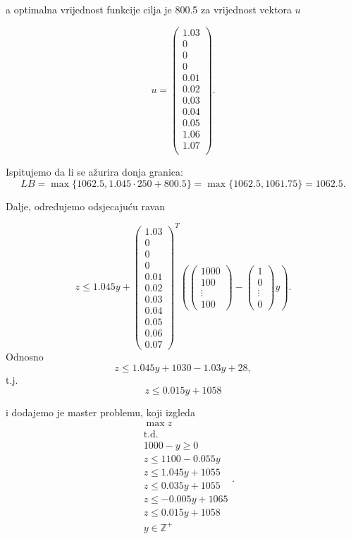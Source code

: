 \documentclass[a4paper, utf8, 11pt, colorlinks]{book}
\theoremstyle{definition}
\begin{document}
 a optimalna vrijednost funkcije cilja je 800.5 za vrijednost vektora $u$
 
 
 $$u=\left(\begin{array}{c}
 	1.03\\
 		0\\
 		0\\
 		0\\
 0.01\\
 0.02\\
 0.03\\
 0.04\\
 0.05\\
 	1.06\\
 	1.07 \\
 \end{array}\right).$$
 
 Ispitujemo da li se ažurira donja granica:
 $$LB = \max\{1062.5, 1.045\cdot 250+ 800.5\} = \max\{1062.5,1061.75\}=1062.5.$$
 
 Dalje, određujemo odsjecajuću ravan
 
 
 $$z\leqslant 1.045y+\left(\begin{array}{c}
 	1.03 \\
 	0 \\
 	0\\
 	0\\
 	0.01\\
 	0.02\\
 	0.03\\
 	0.04\\
 	0.05\\
 	0.06\\
 	0.07
 \end{array}\right)^T
 \left(\left(\begin{array}{c}
 	1000 \\
 	100 \\
 	\vdots \\
 	100
 \end{array}\right)-\left(\begin{array}{c}
 	1 \\
 	0 \\
 	\vdots \\
 	0
 \end{array}\right)y\right).$$
 Odnosno 
 $$z\leqslant 1.045y+1030-1.03y+28,$$
 t.j.
 $$z\leqslant 0.015y+1058$$
 
 i dodajemo je master problemu, koji izgleda
  $$
 \begin{aligned}
 	&\max z\\
 	&\mbox{t.d.}\\
 	&1000-y\geqslant 0\\
 	&z\leqslant 1100-0.055y\\ 
 	&z\leqslant 1.045y+1055\\
 	&z\leqslant 0.035y+1055\\
 	&z\leqslant -0.005y+1065\\
 	&z\leqslant 0.015y+1058\\
 	&y\in\mathbb{Z}^+\\	
 \end{aligned}
 .$$
 
\end{document}
